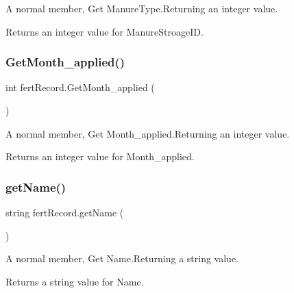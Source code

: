 A normal member, Get Manure\+Type.\+Returning an integer value. 

\begin{DoxyReturn}{Returns}
an integer value for Manure\+Stroage\+ID. 
\end{DoxyReturn}
\mbox{\label{classfert_record_a8d0d7390de337843d5ae1f37d73013d2}} 
\subsubsection{\texorpdfstring{GetMonth\_applied()}{GetMonth\_applied()}}
{\footnotesize\ttfamily int fert\+Record.\+Get\+Month\+\_\+applied (\begin{DoxyParamCaption}{ }\end{DoxyParamCaption})\hspace{0.3cm}{\ttfamily [inline]}}



A normal member, Get Month\+\_\+applied.\+Returning an integer value. 

\begin{DoxyReturn}{Returns}
an integer value for Month\+\_\+applied. 
\end{DoxyReturn}
\mbox{\label{classfert_record_abcaf5c084be3ff3a3f60bce067c3a4cc}} 
\subsubsection{\texorpdfstring{getName()}{getName()}}
{\footnotesize\ttfamily string fert\+Record.\+get\+Name (\begin{DoxyParamCaption}{ }\end{DoxyParamCaption})\hspace{0.3cm}{\ttfamily [inline]}}



A normal member, Get Name.\+Returning a string value. 

\begin{DoxyReturn}{Returns}
a string value for Name. 
\end{DoxyReturn}
\mbox{\label{classfert_record_a6bc947989cbf5d092b1428af9870205e}} 

